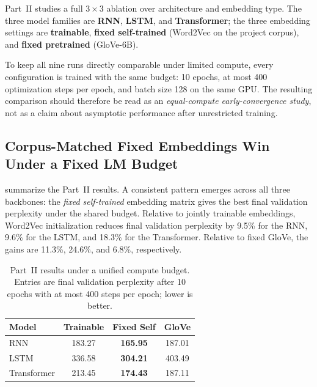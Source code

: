 \documentclass[10pt,a4paper]{article}
\begin{document}
Part~II studies a full $3 \times 3$ ablation over architecture and embedding type. The three model families are \textbf{RNN}, \textbf{LSTM}, and \textbf{Transformer}; the three embedding settings are \textbf{trainable}, \textbf{fixed self-trained} (Word2Vec on the project corpus), and \textbf{fixed pretrained} (GloVe-6B).

To keep all nine runs directly comparable under limited compute, every configuration is trained with the same budget: 10 epochs, at most 400 optimization steps per epoch, and batch size 128 on the same GPU. The resulting comparison should therefore be read as an \emph{equal-compute early-convergence study}, not as a claim about asymptotic performance after unrestricted training.

\subsection{Corpus-Matched Fixed Embeddings Win Under a Fixed LM Budget}
\label{sec:part2_coverage}

 summarize the Part~II results. A consistent pattern emerges across all three backbones: the \emph{fixed self-trained} embedding matrix gives the best final validation perplexity under the shared budget. Relative to jointly trainable embeddings, Word2Vec initialization reduces final validation perplexity by 9.5\% for the RNN, 9.6\% for the LSTM, and 18.3\% for the Transformer. Relative to fixed GloVe, the gains are 11.3\%, 24.6\%, and 6.8\%, respectively.

\begin{table}[htbp]
\centering
\caption{Part~II results under a unified compute budget. Entries are final validation perplexity after 10 epochs with at most 400 steps per epoch; lower is better.}
\label{tab:part2_grid}
\small
\renewcommand{\arraystretch}{1.06}
\begin{tabular}{@{}lccc@{}}
\toprule
\textbf{Model} & \textbf{Trainable} & \textbf{Fixed Self} & \textbf{GloVe} \\
\midrule
RNN         & 183.27 & \textbf{165.95} & 187.01 \\
LSTM        & 336.58 & \textbf{304.21} & 403.49 \\
Transformer & 213.45 & \textbf{174.43} & 187.11 \\
\bottomrule
\end{tabular}
\end{table}
\end{document}
